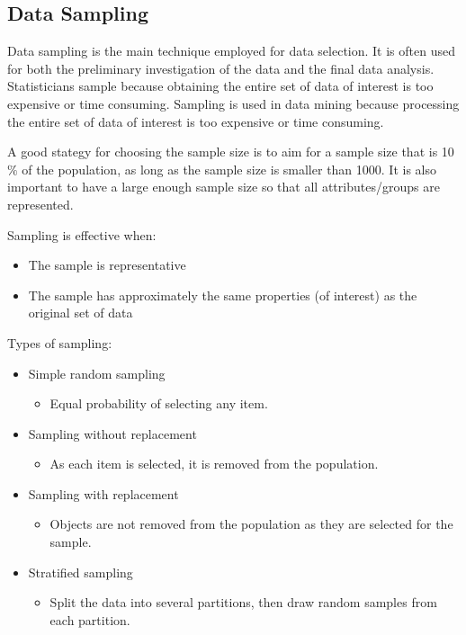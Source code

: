 \subsection{Data Sampling}
Data sampling is the main technique employed for data selection.
It is often used for both the preliminary investigation of the data and the final data analysis.
Statisticians sample because obtaining the entire set of data of interest is too expensive or time consuming.
Sampling is used in data mining because processing the entire set of data of interest is too expensive or time consuming.

\smallskip
A good stategy for choosing the sample size is to aim for a sample size that is 10$\%$ of the population, as long as the sample size is smaller than 1000.
It is also important to have a large enough sample size so that all attributes/groups are represented.

\medskip
Sampling is effective when:
\begin{itemize}
    \item The sample is representative
    \item The sample has approximately the same properties (of interest) as the original set of data
\end{itemize}

\medskip
Types of sampling:
\begin{itemize}
    \item Simple random sampling
    \begin{itemize}
        \item Equal probability of selecting any item.
    \end{itemize}
    \item Sampling without replacement
    \begin{itemize}
        \item As each item is selected, it is removed from the population.
    \end{itemize}
    \item Sampling with replacement
    \begin{itemize}
        \item Objects are not removed from the population as they are selected for the sample.
    \end{itemize}
    \item Stratified sampling
    \begin{itemize}
        \item Split the data into several partitions, then draw random samples from each partition.
    \end{itemize}
\end{itemize}

